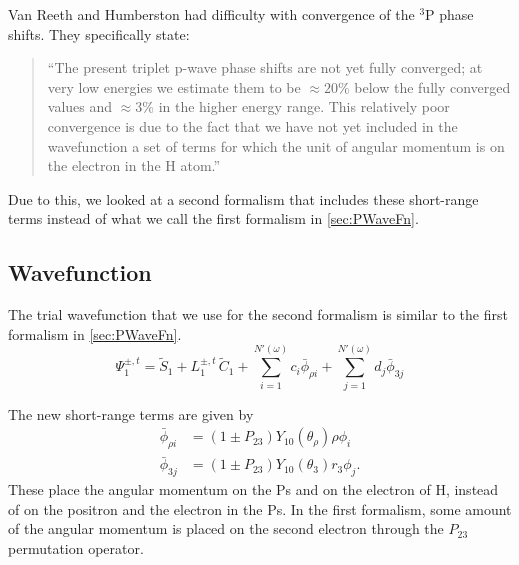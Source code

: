 \documentclass[Dissertation.tex]{subfiles}
\begin{document}
Van Reeth and Humberston \cite{VanReeth2004} had difficulty with convergence 
of the $^3$P phase shifts. They specifically state:
\begin{quote}
``The present triplet p-wave phase shifts are not yet fully converged; at very 
low energies we estimate them to be $\approx 20\%$ below the fully converged 
values and $\approx 3\%$ in the higher energy range. This relatively poor 
convergence is due to the fact that we have not yet included in the 
wavefunction a set of terms for which the unit of angular momentum is on the 
electron in the H atom.''
\end{quote}
Due to this, we looked at a second formalism that includes these short-range 
terms instead of what we call the first formalism in \cref{sec:PWaveFn}. 

\subsection{Wavefunction}
The trial wavefunction that we use for the second formalism is similar to the
first formalism in \cref{sec:PWaveFn}.
\begin{equation}
\Psi_1^{\pm,t} = \widetilde{S}_1 + L_1^{\pm,t} \, \widetilde{C}_1 + \sum_{i=1}^{N'(\omega)} c_i \bar{\phi}_{\rho i} + \sum_{j=1}^{N'(\omega)} d_j \bar{\phi}_{3j}
\label{eq:PWave2ndWavefn}
\end{equation}

\noindent The new short-range terms are given by
\begin{subequations}
\label{eq:PWave2ndPhiBar}
\begin{align}
\bar{\phi}_{\rho i} &= \left(1 \pm P_{23}\right) Y_{10}(\theta_\rho) \rho \phi_i \label{eq:PWave2ndPhi1i}\\
\bar{\phi}_{3j} &= \left(1 \pm P_{23}\right) Y_{10}(\theta_3) r_3 \phi_j \label{eq:PWave2ndPhi2j}.
\end{align}
\end{subequations}
These place the angular momentum on the Ps and on the electron of H, instead of
on the positron and the electron in the Ps. In the first formalism, some amount
of the angular momentum is placed on the second electron through the $P_{23}$
permutation operator.
\end{document}
